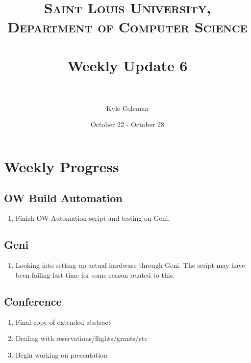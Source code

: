 \documentclass[paper=a4, fontsize=12pt]{scrartcl} %
\title{	
\normalfont \normalsize 
\textsc{Saint Louis University, Department of Computer Science} \\ [25pt] %
\horrule{0.5pt} \\[0.4cm] %
\huge Weekly Update 6\\ %
\horrule{2pt} \\[0.5cm] %
}
\author{Kyle Coleman} %
\date{October 22 - October 28} %
\numberwithin{equation}{section} %
\numberwithin{figure}{section} %
\numberwithin{table}{section} %
\begin{document}
\maketitle %


\section{Weekly Progress}





\subsection{OW Build Automation}
\begin{enumerate}
	\item Finish OW Automation script and testing on Geni.
	
\end{enumerate}


\subsection{Geni}
\begin{enumerate}
	\item Looking into setting up actual hardware through Geni. The script may have been failing last time for some reason related to this.
\end{enumerate}

\subsection{Conference}
\begin{enumerate}
	\item Final copy of extended abstract
	\item Dealing with reservations/flights/grants/etc
	\item Begin working on presentation 
\end{enumerate}

\end{document}
